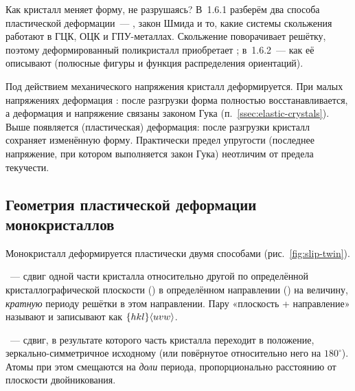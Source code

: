 \begin{orientir}
Как кристалл меняет форму, не разрушаясь? В~1.6.1 разберём два способа
пластической деформации~— , закон
Шмида и то, какие системы скольжения работают в ГЦК, ОЦК и ГПУ-металлах.
Скольжение поворачивает решётку, поэтому деформированный поликристалл
приобретает ; в~1.6.2~— как её описывают (полюсные
фигуры и функция распределения ориентаций).
\end{orientir}

Под действием механического напряжения кристалл деформируется. При малых
напряжениях деформация : после разгрузки форма полностью
восстанавливается, а деформация и напряжение связаны законом Гука
(п.~\ref{ssec:elastic-crystals}). Выше  появляется
 (пластическая) деформация: после разгрузки кристалл
сохраняет изменённую форму. Практически предел упругости (последнее
напряжение, при котором выполняется закон Гука) неотличим от предела
текучести.

\subsection{Геометрия пластической деформации монокристаллов}\label{ssec:slip-geometry}

Монокристалл деформируется пластически двумя способами
(рис.~\ref{fig:slip-twin}).

\begin{opredelenie}
~— сдвиг одной части кристалла относительно другой по
определённой кристаллографической плоскости ()
в определённом направлении () на величину,
\emph{кратную} периоду решётки в этом направлении. Пару «плоскость +
направление» называют  и записывают как
$\{hkl\}\langle uvw\rangle$.

~— сдвиг, в результате которого часть
кристалла переходит в положение, зеркально-симметричное исходному (или
повёрнутое относительно него на $180^\circ$). Атомы при этом смещаются на
\emph{доли} периода, пропорционально расстоянию от плоскости
двойникования.
\end{opredelenie}

